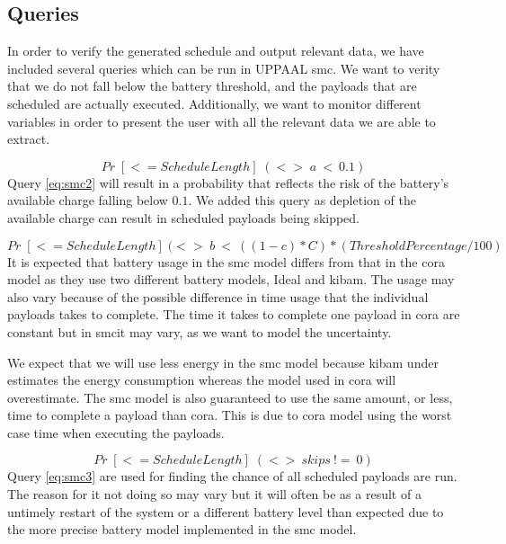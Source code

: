 \subsection{Queries}\label{sec:queries}
In order to verify the generated schedule and output relevant data, we have included several queries which can be run in UPPAAL \gls{smc}. We want to verity that we do not fall below the battery threshold, and the payloads that are scheduled are actually executed. Additionally, we want to monitor different variables in order to present the user with all the relevant data we are able to extract.

\begin{equation} \label{eq:smc1}
	Pr\; [<=ScheduleLength] \; (<>\; a\ <\ 0.1)
\end{equation}
Query \ref{eq:smc2} will result in a probability that reflects the risk of the battery's available charge falling below $0.1$. We added this query as depletion of the available charge can result in scheduled payloads being skipped.

\begin{equation} \label{eq:smc2}
	Pr\; [<=ScheduleLength] \; (<>\; b\ <\ ((1-c)*C) * (ThresholdPercentage / 100)
\end{equation}
It is expected that battery usage in the \gls{smc} model differs from that in the \gls{cora} model as they use two different battery models, Ideal and \gls{kibam}. The usage may also vary because of the possible difference in time usage that the individual payloads takes to complete. The time it takes to complete one payload in \gls{cora} are constant but in \gls{smc}it may vary, as we want to model the uncertainty.

We expect that we will use less energy in the \gls{smc} model because \gls{kibam} under estimates the energy consumption whereas the model used in \gls{cora} will overestimate. The \gls{smc} model is also guaranteed to use the same amount, or less, time to complete a payload than \gls{cora}. This is due to \gls{cora} model using the worst case time when executing the payloads.

\begin{equation} \label{eq:smc3}
	Pr\; [<=ScheduleLength] \; (<> \ skips \ !=\ 0)
\end{equation}
Query \ref{eq:smc3} are used for finding the chance of all scheduled payloads are run. The reason for it not doing so may vary but it will often be as a result of a untimely restart of the system or a different battery level than expected due to the more precise battery model implemented in the \gls{smc} model.

